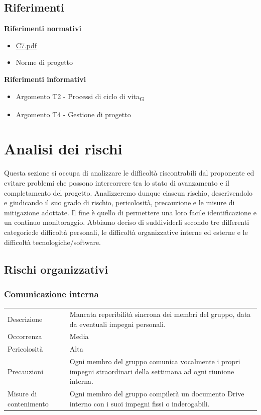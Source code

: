 \documentclass{article}
\begin{document}
\subsection{Riferimenti}
\textbf{Riferimenti normativi}
\begin{itemize}
        \item \href{https://www.math.unipd.it/~tullio/IS-1/2023/Progetto/C7.pdf}{C7.pdf}
        \item{Norme di progetto}
\end{itemize}
\textbf{Riferimenti informativi}
\begin{itemize}
        \item Argomento T2 - Processi di ciclo di vita\textsubscript{G}
        \item Argomento T4 - Gestione di progetto
\end{itemize}

\section{Analisi dei rischi}
Questa sezione si occupa di analizzare le difficoltà riscontrabili dal proponente ed evitare problemi che possono intercorrere tra lo stato di avanzamento e il completamento del progetto. Analizzeremo dunque ciascun rischio, descrivendolo e giudicando il suo grado di rischio, pericolosità, precauzione e le misure di mitigazione adottate. Il fine è quello di permettere una loro facile identificazione e un continuo monitoraggio. Abbiamo deciso di suddividerli secondo tre differenti categorie:le difficoltà personali, le difficoltà organizzative interne ed esterne e le difficoltà tecnologiche/software.

\subsection{Rischi organizzativi}
\subsubsection{Comunicazione interna}
\begin{center}
\begin{tabular}{P{10em} P{20em}} 
     Descrizione & Mancata reperibilità sincrona dei membri del gruppo, data da eventuali impegni personali.\\ 
    Occorrenza & Media\\
    Pericolosità & Alta \\
    Precauzioni & Ogni membro del gruppo comunica vocalmente i propri impegni straordinari della settimana ad ogni riunione interna. \\
    Misure di contenimento & Ogni membro del gruppo compilerà un documento Drive interno  con i suoi impegni fissi o inderogabili. \\
\end{tabular}
\label{tab:cominterna}
\end{center}
\end{document}
